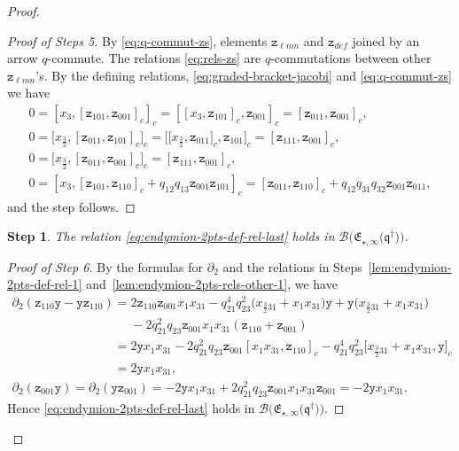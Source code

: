 \documentclass[10pt,a4paper]{amsart}
\numberwithin{equation}{section}
\newtheorem{stepi}{Step}
\newcommand{\toba}{\mathscr B}
\newcommand{\yt}{\mathtt{y}}
\newcommand{\zt}{\mathtt{z}}
\newcommand{\eny}{\mathfrak{E}}
\newcommand{\enyIIb}[1]{\eny_{\star,#1}}
\newcommand{\bq}{\mathfrak{q}}
\newcommand{\bqs}{\bq^{\dagger}}
\newcommand{\tresdos}{\frac{3}{2}}
\begin{document}
\begin{proof}
\begin{proof}[Proof of Steps 5]
By \eqref{eq:q-commut-zs}, elements $\zt_{\ell mn}$ and $\zt_{def}$ joined by an arrow $q$-commute.
The relations \eqref{eq:rels-zs} are $q$-commutations between other $\zt_{\ell mn}$'s.
By the defining relations, \eqref{eq:graded-bracket-jacobi} and \eqref{eq:q-commut-zs} we have
\begin{gather*}
0 = [x_3, [\zt_{101},\zt_{001}]_c]_c = [[x_3, \zt_{101}]_c,\zt_{001}]_c =[\zt_{011},\zt_{001}]_c,
\\
0 = \big[x_{\tresdos}, [\zt_{011},\zt_{101}]_c\big]_c = \big[\big[x_{\tresdos}, \zt_{011}\big]_c,\zt_{101}\big]_c =[\zt_{111},\zt_{001}]_c,
\\
0 = \big[x_{\tresdos}, [\zt_{011},\zt_{001}]_c\big]_c
=[\zt_{111},\zt_{001}]_c,
\\
0 = [x_3, [\zt_{101}, \zt_{110}]_c+q_{12}q_{13}\zt_{001}\zt_{101}]_c
= [\zt_{011}, \zt_{110}]_c+q_{12}q_{31}q_{32}\zt_{001}\zt_{011},
\end{gather*}
and the step follows.
\end{proof}



\begin{stepi}%
The relation \eqref{eq:endymion-2pts-def-rel-last} holds in $\toba\big(\enyIIb{\infty}\big(\bqs\big)\big)$.
\end{stepi}

\begin{proof}[Proof of Step 6]
By the formulas for $\partial_2$ and the relations in Steps~\ref{lem:endymion-2pts-def-rel-1} and~\ref{lem:endymion-2pts-rels-other-1},
we have
\begin{gather*}
\partial_2 (\zt_{110}\yt -\yt\zt_{110}) =
2\zt_{110}\zt_{001}x_1x_{31}
-q_{21}^4q_{23}^2\big(x_{\tresdos31}+x_1x_{31}\big)\yt+\yt\big(x_{\tresdos31}+x_1x_{31}\big)
\\
\phantom{\partial_2 (\zt_{110}\yt -\yt\zt_{110})=}
-2q_{21}^2q_{23}\zt_{001}x_1x_{31}(\zt_{110}+\zt_{001})
\\
\phantom{\partial_2 (\zt_{110}\yt -\yt\zt_{110})}
= 2\yt x_1x_{31}
-2q_{21}^2q_{23}\zt_{001}[x_1x_{31},\zt_{110}]_c
-q_{21}^4q_{23}^2\big[x_{\tresdos31}+x_1x_{31},\yt \big]_c
\\
\phantom{\partial_2 (\zt_{110}\yt -\yt\zt_{110})} = 2\yt x_1x_{31},
\\
\partial_2 (\zt_{001}\yt) = \partial_2 (\yt\zt_{001})
=-2\yt x_1x_{31} + 2q_{21}^2q_{23}\zt_{001}x_1x_{31}\zt_{001}=-2\yt x_1x_{31}.
\end{gather*}
Hence \eqref{eq:endymion-2pts-def-rel-last} holds in $\toba\big(\enyIIb{\infty}\big(\bqs\big)\big)$.
\end{proof}


\end{proof}
\end{document}
